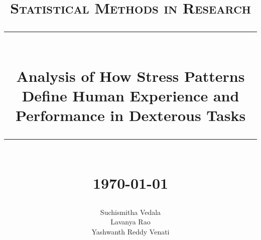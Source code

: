 \documentclass[12pt,epsf]{report}
\newcommand{\HRule}[1]{\rule{\linewidth}{#1}}
\begin{document}
\title{ \large \textsc{Statistical Methods in Research}
		\\ [2.0cm]
		\HRule{1pt} \\
		\LARGE \textbf{{Analysis of How Stress Patterns Define Human Experience and Performance in Dexterous Tasks}}
		\HRule{1pt} \\ [0.5cm]
		\normalsize \today \vspace*{5\baselineskip}}

\date{}

\author{
		Suchismitha Vedala \\ 
		Lavanya Rao \\
		Yashwanth Reddy Venati }

\maketitle
\tableofcontents
\newpage

\sectionfont{\scshape}

\end{document}
